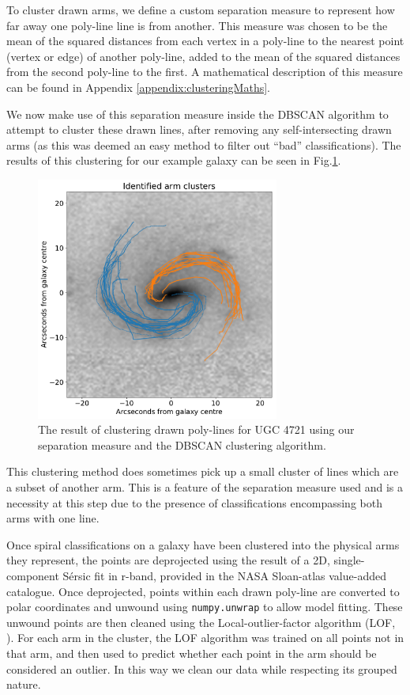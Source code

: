 \documentclass[../main.tex]{subfiles}
\begin{document}
To cluster drawn arms, we define a custom separation measure to represent how far away one poly-line line is from another. This measure was chosen to be the mean of the squared distances from each vertex in a poly-line to the nearest point (vertex or edge) of another poly-line, added to the mean of the squared distances from the second poly-line to the first. A mathematical description of this measure can be found in Appendix \ref{appendix:clusteringMaths}.

We now make use of this separation measure inside the DBSCAN algorithm to attempt to cluster these drawn lines, after removing any self-intersecting drawn arms (as this was deemed an easy method to filter out ``bad'' classifications). The results of this clustering for our example galaxy can be seen in Fig.\ref{fig:arm_clusters}.

\begin{figure}
  \includegraphics[width=8cm]{images__results/arm_clusters.pdf}
  \caption{The result of clustering drawn poly-lines for UGC 4721 using our separation measure and the DBSCAN clustering algorithm.}
  \label{fig:arm_clusters}
\end{figure}

This clustering method does sometimes pick up a small cluster of lines which are a subset of another arm. This is a feature of the separation measure used and is a necessity at this step due to the presence of classifications encompassing both arms with one line.

Once spiral classifications on a galaxy have been clustered into the physical arms they represent, the points are deprojected using the result of a 2D, single-component S\'ersic fit in r-band, provided in the NASA Sloan-atlas value-added catalogue. Once deprojected, points within each drawn poly-line are converted to polar coordinates and unwound using \texttt{numpy.unwrap} to allow model fitting. These unwound points are then cleaned using the Local-outlier-factor algorithm (LOF, \citealt{local-outlier-factor}). For each arm in the cluster, the LOF algorithm was trained on all points not in that arm, and then used to predict whether each point in the arm should be considered an outlier. In this way we clean our data while respecting its grouped nature.
\end{document}

